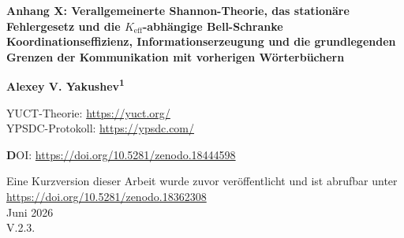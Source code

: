 \documentclass[12pt,a4paper]{article}
\theoremstyle{remark}
\begin{document}
	
	\begin{titlepage}
		\begin{center}
			\vspace*{1cm}
			
			\Huge\textbf{Anhang X: Verallgemeinerte Shannon-Theorie, das stationäre Fehlergesetz und die \(K_{\mathrm{eff}}\)-abhängige Bell-Schranke} \\
			\vspace{0.5cm}
			\Large\textbf{Koordinationseffizienz, Informationserzeugung und die grundlegenden Grenzen der Kommunikation mit vorherigen Wörterbüchern}
			
			\vspace{1.5cm}
			
			\Large\textbf{Alexey V. Yakushev\textsuperscript{1}}
			
			YUCT-Theorie: \url{https://yuct.org/}\\
			YPSDC-Protokoll: \url{https://ypsdc.com/}\\
			
			\vspace{2cm}
			
			\textbf DOI: \url{https://doi.org/10.5281/zenodo.18444598}\\
			
			\vspace{1cm}
			
			\vspace{0cm}
			\large 
			Eine Kurzversion dieser Arbeit wurde zuvor veröffentlicht und ist abrufbar unter\\ \url{https://doi.org/10.5281/zenodo.18362308}\\
			\vspace{1cm}
			Juni 2026 \\ \large V.2.3.
			
			\vspace{2cm}
			

\end{center}
\end{titlepage}
\end{document}
